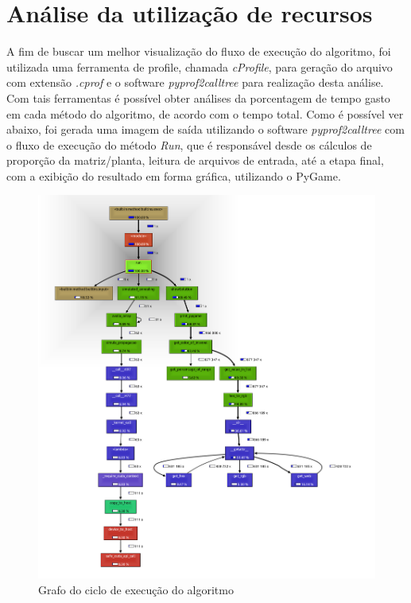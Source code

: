 \documentclass[
	12pt,				%
	twoside,			%
	a4paper,			%
	english,			%
	french,				%
	spanish,			%
	brazil				%
	]{abntex2}
\begin{document}
\section{Análise da utilização de
recursos}\label{anuxe1lise-da-utilizauxe7uxe3o-de-recursos}

A fim de buscar um melhor visualização do fluxo de execução do
algoritmo, foi utilizada uma ferramenta de profile, chamada
\emph{cProfile}, para geração do arquivo com extensão \emph{.cprof} e o
software \emph{pyprof2calltree} para realização desta análise. Com tais
ferramentas é possível obter análises da porcentagem de tempo gasto em
cada método do algoritmo, de acordo com o tempo total. Como é possível
ver abaixo, foi gerada uma imagem de saída utilizando o software
\emph{pyprof2calltree} com o fluxo de execução do método \emph{Run}, que
é responsável desde os cálculos de proporção da matriz/planta, leitura
de arquivos de entrada, até a etapa final, com a exibição do resultado
em forma gráfica, utilizando o PyGame.

\begin{figure}[ht]
    \caption{\label{cprofile} Grafo do ciclo de execução do algoritmo   }
    \begin{center}
        \includegraphics[scale=0.48]{imagens/graph.jpg}
    \end{center}
\end{figure}
\end{document}
